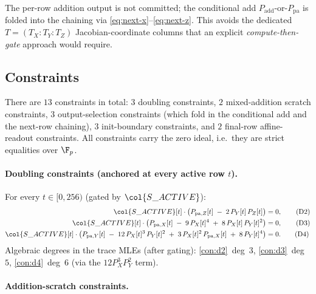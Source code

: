 \begin{remark}
\label{rem:no-add-witness}
The per-row addition output is not committed; the conditional add
$P_{\mathrm{add}}$-or-$P_{\mathrm{pa}}$ is folded into the
chaining via \eqref{eq:next-x}--\eqref{eq:next-z}. This avoids
the dedicated $T = (T_X : T_Y : T_Z)$ Jacobian-coordinate columns that an
explicit \emph{compute-then-gate} approach would require.
\end{remark}

\subsection{Constraints}\label{sec:constraints}

There are $13$ constraints in total: $3$ doubling constraints, $2$
mixed-addition scratch constraints, $3$ output-selection constraints
(which fold in the conditional add and the next-row chaining),
$3$ init-boundary constraints, and $2$ final-row affine-readout
constraints. All constraints carry the zero ideal,
i.e.\ they are strict equalities over $\F_p$.

\paragraph{Doubling constraints (anchored at every active row $t$).}

For every $t \in [0, 256)$ (gated by $\col{S\_ACTIVE}$):
\begin{align}
\col{S\_ACTIVE}[t] \cdot \bigl(P_{\mathrm{pa},Z}[t] \;-\; 2\, P_Y[t]\, P_Z[t]\bigr) &= 0,\tag{D2}\label{con:d2}\\
\col{S\_ACTIVE}[t] \cdot \bigl(P_{\mathrm{pa},X}[t] \;-\; 9\, P_X[t]^4 \;+\; 8\, P_X[t]\, P_Y[t]^2\bigr) &= 0,\tag{D3}\label{con:d3}\\
\col{S\_ACTIVE}[t] \cdot \bigl(P_{\mathrm{pa},Y}[t] \;-\; 12\, P_X[t]^3\, P_Y[t]^2 \;+\; 3\, P_X[t]^2\, P_{\mathrm{pa},X}[t] \;+\; 8\, P_Y[t]^4\bigr) &= 0.\tag{D4}\label{con:d4}
\end{align}
Algebraic degrees in the trace MLEs (after gating): \ref{con:d2}~deg~$3$, \ref{con:d3}~deg~$5$, \ref{con:d4}~deg~$6$ (via the $12 P_X^3 P_Y^2$ term).

\paragraph{Addition-scratch constraints.}

